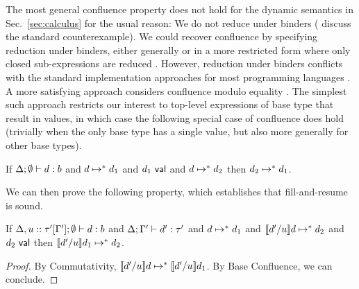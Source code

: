 The most general confluence property does not hold for the dynamic
semantics in Sec.~\ref{sec:calculus} for the usual reason: We do not
reduce under binders (\citet{DBLP:conf/birthday/BlancLM05} discuss the
standard counterexample).
%
We could recover confluence by specifying reduction under binders,
either generally or in a more restricted form where only closed
sub-expressions are
reduced \cite{DBLP:journals/tcs/CagmanH98,DBLP:conf/birthday/BlancLM05,levy1999explicit}.
%
However, reduction under binders conflicts with the standard implementation approaches
for most programming languages \cite{DBLP:conf/birthday/BlancLM05}.
%
A more satisfying approach considers confluence modulo equality \cite{Huet:1980ng}.
%
The simplest such approach restricts our interest to top-level expressions
of base type that result in values, in which case the following
special case of confluence does hold (trivially when the only base
type has a single value, but also more generally for other base
types).
\begin{lem}
  If $\Delta; \emptyset \vdash d : b$ and
  $d \mapsto^* d_1$
  and $d_1~\mathsf{val}$
  and $d \mapsto^* d_2$
  then $d_2 \mapsto^* d_1$.
\end{lem}
We can then prove the following property, which establishes that fill-and-resume is sound.
\begin{thm}[Resumption]
  If $\Delta, u :: \tau'[\Gamma']; \emptyset \vdash d : b$
  and $\Delta; \Gamma' \vdash d' : \tau'$
  and $d \mapsto^* d_1$
  and $\llbracket d' / u\rrbracket d \mapsto^* d_2$
  and $d_2~\mathsf{val}$
  then $\llbracket d' / u\rrbracket d_1 \mapsto^* d_2$.
  \begin{proof}
    By Commutativity,
    $\llbracket d' / u\rrbracket d \mapsto^* \llbracket d' / u\rrbracket d_1$.
    By Base Confluence, we can conclude.
  \end{proof}
\end{thm}
